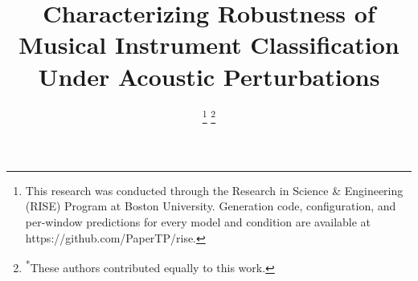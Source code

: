 \documentclass[conference]{IEEEtran}
\begin{document}
\title{Characterizing Robustness of Musical Instrument Classification Under Acoustic Perturbations}

\author{
\and
{}
\and
{}
\and
{}
\thanks{This research was conducted through the Research in Science \&
Engineering (RISE) Program at Boston University. Generation code, configuration,
and per-window predictions for every model and condition are available at
https://github.com/PaperTP/rise.}
\thanks{\textsuperscript{*}These authors contributed equally to this work.}
}
\end{document}
